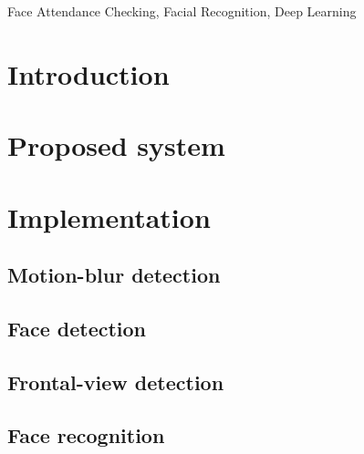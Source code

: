 \documentclass[journal, twocolumn]{IEEEtran}
\begin{document}
\begin{IEEEkeywords}
Face Attendance Checking, Facial Recognition, Deep Learning
\end{IEEEkeywords}


\IEEEpeerreviewmaketitle


\section{Introduction}
\label{introduction}


\medskip
\section{Proposed system}
\label{proposed-system}


\medskip
\section{Implementation}
\label{implementation}

\subsection{Motion-blur detection}
\label{motion-blur-detection}

\subsection{Face detection}
\label{face-detection}

\subsection{Frontal-view detection}
\label{frontal-view-detection}

\subsection{Face recognition}
\label{face-recognition}
\end{document}
